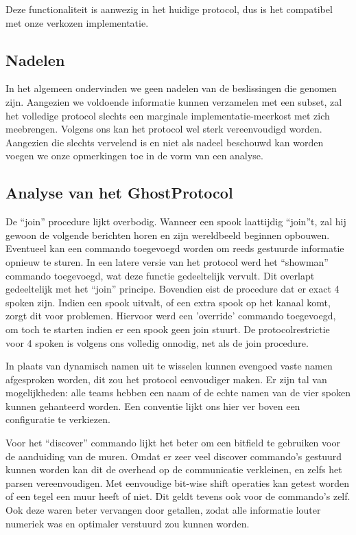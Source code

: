 \documentclass[12pt,a4paper]{report}
\begin{document}
Deze functionaliteit is aanwezig in het huidige protocol, dus is het compatibel met onze verkozen implementatie.

\subsection{Nadelen}

In het algemeen ondervinden we geen nadelen van de beslissingen die genomen zijn. Aangezien we voldoende informatie kunnen verzamelen met een subset, zal het volledige protocol slechts een marginale implementatie-meerkost met zich meebrengen. Volgens ons kan het protocol wel sterk vereenvoudigd worden. Aangezien die slechts vervelend is en niet als nadeel beschouwd kan worden voegen we onze opmerkingen toe in de vorm van een analyse.

\subsection{Analyse van het GhostProtocol}

De ``join'' procedure lijkt overbodig. Wanneer een spook laattijdig ``join''t, zal hij gewoon de volgende berichten horen en zijn wereldbeeld beginnen opbouwen. Eventueel kan een commando toegevoegd worden om reeds gestuurde informatie opnieuw te sturen. In een latere versie van het protocol werd het ``showman'' commando toegevoegd, wat deze functie gedeeltelijk vervult. Dit overlapt gedeeltelijk met het ``join'' principe. Bovendien eist de procedure dat er exact 4 spoken zijn. Indien een spook uitvalt, of een extra spook op het kanaal komt, zorgt dit voor problemen. Hiervoor werd een 'override' commando toegevoegd, om toch te starten indien er een spook geen join stuurt. De protocolrestrictie voor 4 spoken is volgens ons volledig onnodig, net als de join procedure. 

In plaats van dynamisch namen uit te wisselen kunnen evengoed vaste namen afgesproken worden, dit zou het protocol eenvoudiger maken. Er zijn tal van mogelijkheden: alle teams hebben een naam of de echte namen van de vier spoken kunnen gehanteerd worden. Een conventie lijkt ons hier ver boven een configuratie te verkiezen.

Voor het ``discover'' commando lijkt het beter om een bitfield te gebruiken voor de aanduiding van de muren. Omdat er zeer veel discover commando's gestuurd kunnen worden kan dit de overhead op de communicatie verkleinen, en zelfs het parsen vereenvoudigen. Met eenvoudige bit-wise shift operaties kan getest worden of een tegel een muur heeft of niet. Dit geldt tevens ook voor de commando's zelf. Ook deze waren beter vervangen door getallen, zodat alle informatie louter numeriek was en optimaler verstuurd zou kunnen worden.
\end{document}
